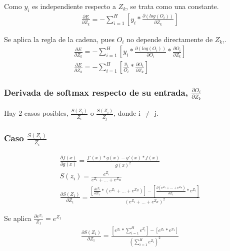 Como $y_i$ es independiente respecto a $Z_k$, se trata como una constante. \\
\begin{gather}
	\frac{\partial E}{\partial Z_k} = - \sum_{i=1}^{H}  [y_i * \frac{\partial(log(O_i))}{\partial Z_k}] 
\end{gather}

Se aplica la regla de la cadena, pues $O_i$ no depende directamente de $Z_k$,. \\
\begin{gather}	
	\frac{\partial E}{\partial Z_k} = - \sum_{i=1}^{H}  [y_i * \frac{\partial(log(O_i))}{\partial O_i} * \frac{\partial O_i}{\partial Z_k}] \\
	\frac{\partial E}{\partial Z_k} = - \sum_{i=1}^{H}  [\frac{y_i}{O_i} * \frac{\partial O_i}{\partial Z_k}] 
	\label{gradiente_Oi_Zk}
\end{gather}


\subsubsection{Derivada de softmax respecto de su entrada, $\frac{\partial O_i}{\partial Z_k}$}

Hay 2 casos posibles, $\frac{S(Z_i)}{Z_i}$ o $\frac{S(Z_i)}{Z_j}$, donde i $\neq$ j. \\

\subsubsection{Caso $\frac{S(Z_i)}{Z_i}$}

\begin{gather}
	\frac{\partial f(x)}{\partial g(x)} = \frac{f'(x)*g(x) - g'(x)*f(x)}{g(x)^2} \\
	S(z_i) = \frac{e^{Z_i}}{e^{Z_1} + ... + e^{Z_H}} \\
	\frac{\partial S(Z_1)}{\partial Z_1} = \frac{[\frac{\partial e^{Z_1}}{\partial Z_1} * (e^{Z_1} + ... + e^{Z_H}) ] - [\frac{\partial (e^{Z_1} + ... + e^{Z_H})}{\partial Z_1} * e^{Z_1} ] }{(e^{Z_1} + ... + e^{Z_H})^2} 
\end{gather}

Se aplica $\frac{\partial e^{Z_1}}{Z_1} = e^{Z_1}$ \\
\begin{gather}
	\frac{\partial S(Z_1)}{\partial Z_1} = \frac{[e^{Z_1} * \sum_{i=1}^{H}  e^{Z_i}] - [e^{Z_1} * e^{Z_1}]   }{ (\sum_{i=1}^{H}  e^{Z_i})^2} \\
\end{gather}

